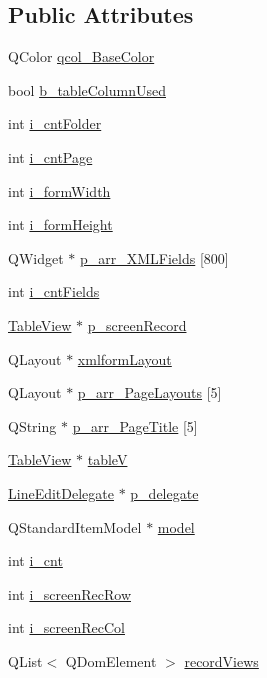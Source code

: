\subsection*{Public Attributes}
\begin{DoxyCompactItemize}
\item 
QColor \hyperlink{classXML2Form_aaf96ae45cb0c2c4c58e9e6d86385c0c4}{qcol\_\-BaseColor}
\item 
bool \hyperlink{classXML2Form_aca390efca9cfb6233372fe20f583c2ab}{b\_\-tableColumnUsed}
\item 
int \hyperlink{classXML2Form_a7d4f92c44bd1ac3f9a8aa31c8081f077}{i\_\-cntFolder}
\item 
int \hyperlink{classXML2Form_a5053e99259b0e7720ce7e9ad5ba397f8}{i\_\-cntPage}
\item 
int \hyperlink{classXML2Form_a66eb7e8e2ca2f84f01e7175a518679a9}{i\_\-formWidth}
\item 
int \hyperlink{classXML2Form_a9ec68b9ec9319af60841934e2f9dd132}{i\_\-formHeight}
\item 
QWidget $\ast$ \hyperlink{classXML2Form_abfb6a1adcacc676da34e9bafa8f2eb39}{p\_\-arr\_\-XMLFields} \mbox{[}800\mbox{]}
\item 
int \hyperlink{classXML2Form_ad747ac3452cf4212ded9dfb4632d6bf8}{i\_\-cntFields}
\item 
\hyperlink{classTableView}{TableView} $\ast$ \hyperlink{classXML2Form_a03f67ad20c8828f5864659ce6740bcb7}{p\_\-screenRecord}
\item 
QLayout $\ast$ \hyperlink{classXML2Form_ae48311c25310084db4c3847ca6d38246}{xmlformLayout}
\item 
QLayout $\ast$ \hyperlink{classXML2Form_a3f1e41e202d65c9bf760c03aa7b3e440}{p\_\-arr\_\-PageLayouts} \mbox{[}5\mbox{]}
\item 
QString $\ast$ \hyperlink{classXML2Form_af9e35a7f57bce3c06e15b1ded76f5155}{p\_\-arr\_\-PageTitle} \mbox{[}5\mbox{]}
\item 
\hyperlink{classTableView}{TableView} $\ast$ \hyperlink{classXML2Form_a765978f88c9ea144f7488fffa3f011f3}{tableV}
\item 
\hyperlink{classLineEditDelegate}{LineEditDelegate} $\ast$ \hyperlink{classXML2Form_aa69423c0c79ac964cb295be17856bb85}{p\_\-delegate}
\item 
QStandardItemModel $\ast$ \hyperlink{classXML2Form_af3d7959ecccc1032081211b0681fea50}{model}
\item 
int \hyperlink{classXML2Form_a984c469e4d9c9ffc99c99897bd3122bf}{i\_\-cnt}
\item 
int \hyperlink{classXML2Form_a11097ff5d10cd176646e3c154405c035}{i\_\-screenRecRow}
\item 
int \hyperlink{classXML2Form_ac6c302b110a9608d7f607199a22d8a7b}{i\_\-screenRecCol}
\item 
QList$<$ QDomElement $>$ \hyperlink{classXML2Form_a9111b53f6b6c4f5c1433eb018b1a5434}{recordViews}
\end{DoxyCompactItemize}
